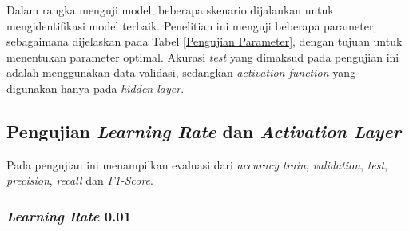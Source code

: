     Dalam rangka menguji model, beberapa skenario dijalankan untuk mengidentifikasi model terbaik.
     Penelitian ini menguji beberapa parameter, sebagaimana dijelaskan pada Tabel \ref{Pengujian Parameter}, dengan 
     tujuan untuk menentukan parameter optimal.  Akurasi \textit{test} yang dimaksud pada pengujian 
     ini adalah menggunakan data validasi, sedangkan \textit{activation function} yang digunakan 
     hanya pada \textit{hidden layer}.


    
        
\subsection{Pengujian \textit{Learning Rate} dan \textit{Activation Layer}}

    Pada pengujian ini menampilkan evaluasi dari \textit{accuracy} \textit{train}, \textit{validation}, \textit{test}, \textit{precision}, \textit{recall} dan \textit{F1-Score}.

\subsubsection{\textit{Learning Rate} 0.01}

